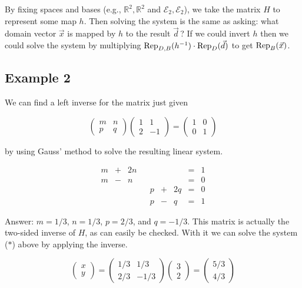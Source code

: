 By fixing spaces and bases (e.g., $\mathbb{R}^2, \mathbb{R}^2$ and $\mathcal{E}
_2,\mathcal{E} _2$), we take the matrix $H$ to represent some map $h$. Then solving the
system is the same as asking: what domain vector $\vec{x}$ is mapped by $h$ to the result
$\vec{d}\,$? If we could invert $h$ then we could solve the system by multiplying ${\rm
Rep} _{D,B}(h^{-1})\cdot{\rm Rep} _{D}(\vec{d})$ to get ${\rm Rep} _{B}(\vec{x})$.




\subsection{Example 2}
\label{sss:exam-5bdd}




We can find a left inverse for the matrix just given



$$\begin{pmatrix} m  & n  \\ p  & q \end{pmatrix} \begin{pmatrix} 1  & 1  \\ 2  & -1 \end{pmatrix} = \begin{pmatrix} 1  & 0  \\ 0  & 1 \end{pmatrix}$$



by using Gauss' method to solve the resulting linear system.



\begin{align}
m & + & 2n & & & & & = & 1 \\
m & - & n & & & & & = & 0 \\
 & & & & p & + & 2q & = & 0 \\
  & & & & p & - & q & = & 1
\end{align}



Answer: $m=1/3$, $n=1/3$, $p=2/3$, and $q=-1/3$. This matrix is actually the two-sided
inverse of $H$, as can easily be checked. With it we can solve the system ($*$) above by
applying the inverse.



$$\begin{pmatrix} x \\ y \end{pmatrix} =\begin{pmatrix} 1/3 & 1/3  \\ 2/3 & -1/3 \end{pmatrix} \begin{pmatrix} 3 \\ 2 \end{pmatrix} =\begin{pmatrix} 5/3 \\ 4/3 \end{pmatrix}$$




